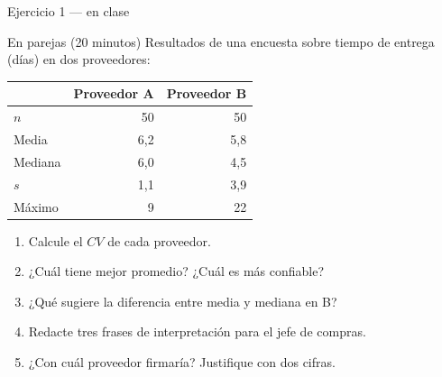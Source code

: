 \documentclass[aspectratio=169,10pt]{beamer}
\begin{document}
\begin{frame}{Ejercicio 1 — en clase}
  \begin{alertblock}{En parejas (20 minutos)}
    \scriptsize
    Resultados de una encuesta sobre tiempo de entrega (días) en dos
    proveedores:

    \vspace{0.15cm}
    \centering
    \begin{tabular}{@{}lrr@{}}
      \toprule
      & \textbf{Proveedor A} & \textbf{Proveedor B} \\
      \midrule
      $n$ & 50 & 50 \\
      Media & 6{,}2 & 5{,}8 \\
      Mediana & 6{,}0 & 4{,}5 \\
      $s$ & 1{,}1 & 3{,}9 \\
      Máximo & 9 & 22 \\
      \bottomrule
    \end{tabular}

    \vspace{0.2cm}
    \raggedright
    \begin{enumerate}\setlength{\itemsep}{-0.07cm}
      \item Calcule el $CV$ de cada proveedor.
      \item ¿Cuál tiene mejor promedio? ¿Cuál es más confiable?
      \item ¿Qué sugiere la diferencia entre media y mediana en B?
      \item Redacte tres frases de interpretación para el jefe de compras.
      \item ¿Con cuál proveedor firmaría? Justifique con dos cifras.
    \end{enumerate}
  \end{alertblock}
\end{frame}
\end{document}
